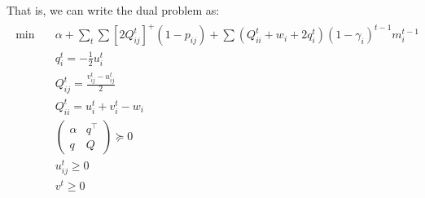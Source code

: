 \documentclass[10pt,leqno]{amsart}
\begin{document}
That is, we can write the dual problem as:
\begin{align}
  \label{SDP-D'}
  \tag{SDP-D'}
  \begin{split}
    \min\quad &\alpha+\sum_t\sum [2Q_{ij}^t]^+(1-p_{ij})+\sum (Q_{ii}^t+w_i+2q_i^t)(1-\gamma_i)^{t-1}m_i^{t-1}\\
    &q^t_i=-\frac{1}{2}u_i^t\\
    &Q^t_{ij}=\frac{v_{ij}^t-u_{ij}^t  }{2}\\
    &Q^t_{ii}=u_{i}^t+v_i^t-w_i\\
    &
    \begin{pmatrix}
      \alpha&q^\top\\
      q&Q
    \end{pmatrix}\succeq 0\\
    &u_{ij}^t\geq0\\
    &v^t\geq 0
  \end{split}
\end{align}
\newpage


\end{document}
